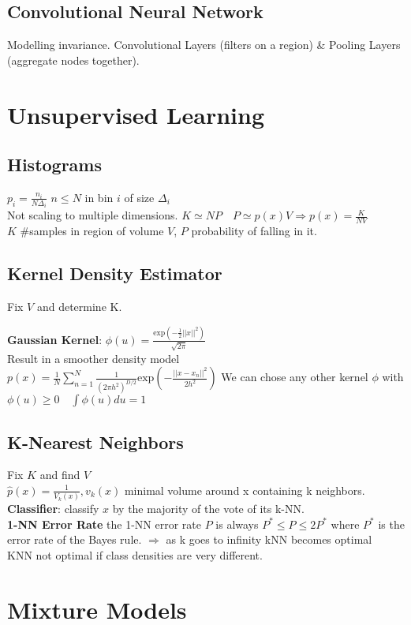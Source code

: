 \subsection*{Convolutional Neural Network}
Modelling invariance.
Convolutional Layers (filters on a region) \& Pooling Layers (aggregate nodes together).

\section*{Unsupervised Learning}
\subsection*{Histograms}
$p_i = \frac{n_i}{N\Delta_i}$ $n\leq N$ in bin $i$ of size $\Delta_i$\\
Not scaling to multiple dimensions.
$K\simeq NP\quad P\simeq p(x)V \Rightarrow p(x) = \frac{K}{NV}$\\
$K$ \#samples in region of volume $V$, $P$ probability of falling in it. 
\subsection*{Kernel Density Estimator}
Fix $V$ and determine K.

\textbf{Gaussian Kernel}: 
$ \phi(u){=} \frac{\mathrm{exp}({-}\frac{1}{2}||x||^2)}{\sqrt{2\pi}}$\\
Result in a smoother density model\\
$p(x)=\frac{1}{N}\sum_{n=1}^N\frac{1}{(2\pi h^2)^{D/2}}\mathrm{exp}(-\frac{||x-x_n||^2}{2h^2})$
We can chose any other kernel $\phi$ with $\phi(u)\geq0\quad\int\phi(u)du=1$

\subsection*{K-Nearest Neighbors}
Fix $K$ and find $V$\\
$\hat{p}(x)=\frac{1}{V_k(x)}, v_k(x)$ minimal volume around x containing k neighbors.\\
\textbf{Classifier}: classify $x$ by the majority of the vote of its k-NN.\\
\textbf{1-NN Error Rate}
the 1-NN error rate $P$ is always $P^*\leq P\leq 2P^*$ where $P^*$ is the error rate of the Bayes rule.
$\Rightarrow$ as k goes to infinity kNN becomes optimal\\
KNN not optimal if class densities are very different.

\section*{Mixture Models}
